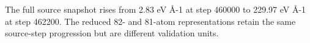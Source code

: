 The full source snapshot rises from 2.83 eV \AA{}-1 at step 460000 to 229.97 eV \AA{}-1 at step 462200. The reduced 82- and 81-atom representations retain the same source-step progression but are different validation units.
